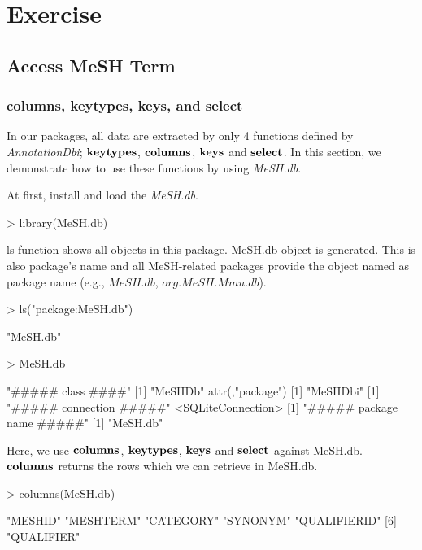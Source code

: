 \documentclass[11pt]{article}
\newcommand{\Rpackage}[1]{{\textit{#1}}}
\begin{document}
\section{Exercise}
\subsection{Access MeSH Term}
\subsubsection{columns, keytypes, keys, and select}
In our packages, all data are extracted by only 4 functions defined by \Rpackage{AnnotationDbi}; $\bf{keytypes}$, $\bf{columns}$, $\bf{keys}$ and $\bf{select}$. In this section, we demonstrate how to use these functions by using \Rpackage{MeSH.db}.

At first, install and load the \Rpackage{MeSH.db}.
\begin{center}
\begin{Schunk}
\begin{Sinput}
> library(MeSH.db)
\end{Sinput}
\end{Schunk}
\end{center}

ls function shows all objects in this package. MeSH.db object is generated. This is also package's name and all MeSH-related packages provide the object named as package name (e.g., $MeSH.db$, $org.MeSH.Mmu.db$).
\begin{center}
\begin{Schunk}
\begin{Sinput}
> ls("package:MeSH.db")
\end{Sinput}
\begin{Soutput}
[1] "MeSH.db"
\end{Soutput}
\begin{Sinput}
> MeSH.db
\end{Sinput}
\begin{Soutput}
[1] "##### class ####"
[1] "MeSHDb"
attr(,"package")
[1] "MeSHDbi"
[1] "##### connection #####"
<SQLiteConnection>
[1] "##### package name #####"
[1] "MeSH.db"
\end{Soutput}
\end{Schunk}
\end{center}

Here, we use $\bf{columns}$, $\bf{keytypes}$, $\bf{keys}$ and $\bf{select}$ against MeSH.db.\\

$\bf{columns}$ returns the rows which we can retrieve in MeSH.db.
\begin{center}
\begin{Schunk}
\begin{Sinput}
> columns(MeSH.db)
\end{Sinput}
\begin{Soutput}
[1] "MESHID"      "MESHTERM"    "CATEGORY"    "SYNONYM"     "QUALIFIERID"
[6] "QUALIFIER"  
\end{Soutput}
\end{Schunk}
\end{center}
\end{document}

